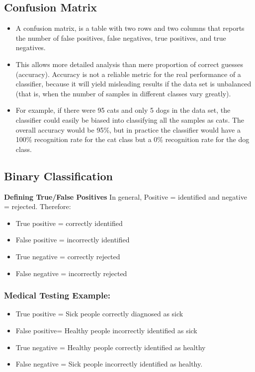 \documentclass[a4paper,12pt]{article}
\begin{document}
\subsection*{Confusion Matrix}
\begin{itemize}
	\item A confusion matrix, is a table with two rows and two columns that reports
	the number of false positives, false negatives, true positives, and true
	negatives.
	\item This allows more detailed analysis than mere proportion of correct guesses
	(accuracy). Accuracy is not a reliable metric for the real performance of a
	classifier, because it will yield misleading results if the data set is unbalanced
	(that is, when the number of samples in different classes vary greatly).
	
	\item For example, if there were 95 cats and only 5 dogs in the data set, the
	classifier could easily be biased into classifying all the samples as cats. The
	overall accuracy would be 95\%, but in practice the classifier would have a
	100\% recognition rate for the cat class but a 0\% recognition rate for the dog
	class.
\end{itemize}
\subsection{Binary Classification}
\noindent \textbf{Defining True/False Positives}
In general, Positive = identified and negative = rejected. Therefore:

\begin{itemize}
	\item True positive = correctly identified
	
	\item False positive = incorrectly identified
	
	\item True negative = correctly rejected
	
	\item False negative = incorrectly rejected
\end{itemize}
\subsubsection*{Medical Testing Example:}
\begin{itemize}
	\item True positive = Sick people correctly diagnosed as sick
	
	\item False positive= Healthy people incorrectly identified as sick
	
	\item True negative = Healthy people correctly identified as healthy
	
	\item False negative = Sick people incorrectly identified as healthy.
\end{itemize}
\end{document}
